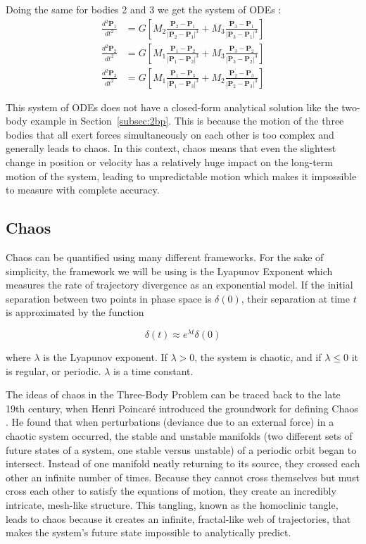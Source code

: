 \documentclass[12pt]{article}
\begin{document}
Doing the same for bodies 2 and 3 we get the system of ODEs \citep{murray1999solar}:
\begin{align*}
\frac{d^2\mathbf{P}_1}{dt^2} &= G \left[ M_2 \frac{\mathbf{P}_2 - \mathbf{P}_1}{|\mathbf{P}_2 - \mathbf{P}_1|^3} + M_3 \frac{\mathbf{P}_3 - \mathbf{P}_1}{|\mathbf{P}_3 - \mathbf{P}_1|^3} \right] \\[1em]
\frac{d^2\mathbf{P}_2}{dt^2} &= G \left[ M_1 \frac{\mathbf{P}_1 - \mathbf{P}_2}{|\mathbf{P}_1 - \mathbf{P}_2|^3} + M_3 \frac{\mathbf{P}_3 - \mathbf{P}_2}{|\mathbf{P}_3 - \mathbf{P}_2|^3} \right] \\[1em]
\frac{d^2\mathbf{P}_3}{dt^2} &= G \left[ M_1 \frac{\mathbf{P}_1 - \mathbf{P}_3}{|\mathbf{P}_1 - \mathbf{P}_3|^3} + M_2 \frac{\mathbf{P}_2 - \mathbf{P}_3}{|\mathbf{P}_2 - \mathbf{P}_3|^3} \right]
\end{align*}

This system of ODEs does not have a closed-form analytical solution like the two-body example in Section~\ref{subsec:2bp}. This is because the motion of the three bodies that all exert forces simultaneously on each other is too complex and generally leads to chaos. In this context, chaos means that even the slightest change in position or velocity has a relatively huge impact on the long-term motion of the system, leading to unpredictable motion which makes it impossible to measure with complete accuracy.

\subsection{Chaos}
\label{Chaos}
Chaos can be quantified using many different frameworks. For the sake of simplicity, the framework we will be using is the Lyapunov Exponent \citep{ott2002chaos} which measures the rate of trajectory divergence as an exponential model. If the initial separation between two points in phase space is $\delta(0)$, their separation at time $t$ is approximated by the function

$$\delta(t) \approx e^{\lambda t} \delta(0)$$

where $\lambda$ is the Lyapunov exponent. If $\lambda > 0$, the system is chaotic, and if $\lambda \leq 0$ it is regular, or periodic. $\lambda$ is a time constant.

The ideas of chaos in the Three-Body Problem can be traced back to the late 19th century, when Henri Poincar\'{e} introduced the groundwork for defining Chaos \citep{poincare1890sur}. He found that when perturbations (deviance due to an external force) in a chaotic system occurred, the stable and unstable manifolds (two different sets of future states of a system, one stable versus unstable) of a periodic orbit began to intersect. Instead of one manifold neatly returning to its source, they crossed each other an infinite number of times. Because they cannot cross themselves but must cross each other to satisfy the equations of motion, they create an incredibly intricate, mesh-like structure. This tangling, known as the homoclinic tangle, leads to chaos because it creates an infinite, fractal-like web of trajectories, that makes the system's future state impossible to analytically predict.
\end{document}
